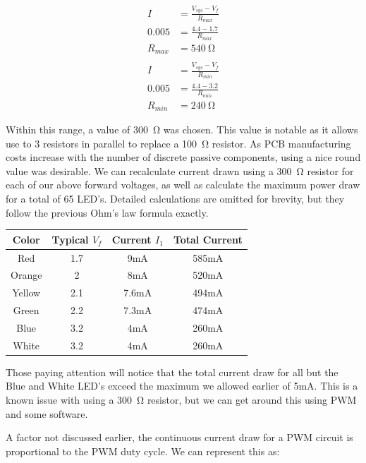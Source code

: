 \documentclass[11pt]{article}
\begin{document}
\begin{equation}
\begin{aligned}
	I &= \frac{V_{sys} - V_f}{R_{max}} \\
	0.005 &= \frac{4.4 - 1.7}{R_{max}} \\
	R_{max} &= \SI{540}{\ohm} \\
	\\
	I &= \frac{V_{sys} - V_f}{R_{min}} \\
	0.005 &= \frac{4.4 - 3.2}{R_{min}} \\
	R_{min} &= \SI{240}{\ohm}
\end{aligned}
\end{equation}

Within this range, a value of \SI{300}{\ohm} was chosen. This value is notable as it allows use to 3 resistors in parallel to replace a \SI{100}{\ohm} resistor. As PCB manufacturing costs increase with the number of discrete passive components,\footnotemark {} using a nice round value was desirable. We can recalculate current drawn using a \SI{300}{\ohm} resistor for each of our above forward voltages, as well as calculate the maximum power draw for a total of 65 LED's. Detailed calculations are omitted for brevity, but they follow the previous Ohm's law formula exactly.

\begin{center}
\begin{tabular}{ | c | c | c | c |}
	\hline
	\textbf{Color} & \textbf{Typical }\(V_f\) & \textbf{Current } \(I_1\) & \textbf{Total Current}\\
	\hline
	Red & 1.7 & 9mA & 585mA \\
	Orange & 2 & 8mA & 520mA \\
	Yellow & 2.1 & 7.6mA & 494mA \\
	Green & 2.2 & 7.3mA & 474mA \\
	Blue & 3.2 & 4mA & 260mA \\
	White & 3.2 & 4mA & 260mA \\
	\hline
\end{tabular}
\end{center}

Those paying attention will notice that the total current draw for all but the Blue and White LED's exceed the maximum we allowed earlier of 5mA. This is a known issue with using a \SI{300}{\ohm} resistor, but we can get around this using PWM and some software. 

A factor not discussed earlier, the continuous current draw for a PWM circuit is proportional to the PWM duty cycle. We can represent this as:
\end{document}
